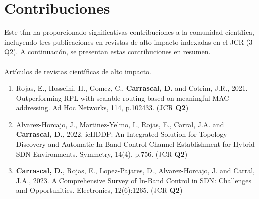 \section{Contribuciones}
\label{sec:contributions}


Este \gls*{tfm} ha proporcionado significativas contribuciones a la comunidad científica, incluyendo tres publicaciones en revistas de alto impacto indexadas en el JCR (3 Q2). A continuación, se presentan estas contribuciones en resumen.\\
\\
Artículos de revistas científicas de alto impacto.

\begin{enumerate}
    \item Rojas, E., Hosseini, H., Gomez, C., \textbf{Carrascal, D.} and Cotrim, J.R., 2021. Outperforming RPL with scalable routing based on meaningful MAC addressing. Ad Hoc Networks, 114, p.102433. (JCR \textbf{Q2})
    \item Alvarez-Horcajo, J., Martinez-Yelmo, I., Rojas, E., Carral, J.A. and \textbf{Carrascal, D.}, 2022. ieHDDP: An Integrated Solution for Topology Discovery and Automatic In-Band Control Channel Establishment for Hybrid SDN Environments. Symmetry, 14(4), p.756. (JCR \textbf{Q2})
    \item \textbf{Carrascal, D.}, Rojas, E., Lopez-Pajares, D., Alvarez-Horcajo, J. and Carral, J.A., 2023. A Comprehensive Survey of In-Band Control in SDN:
          Challenges and Opportunities. Electronics, 12(6):1265. (JCR \textbf{Q2})
\end{enumerate}



